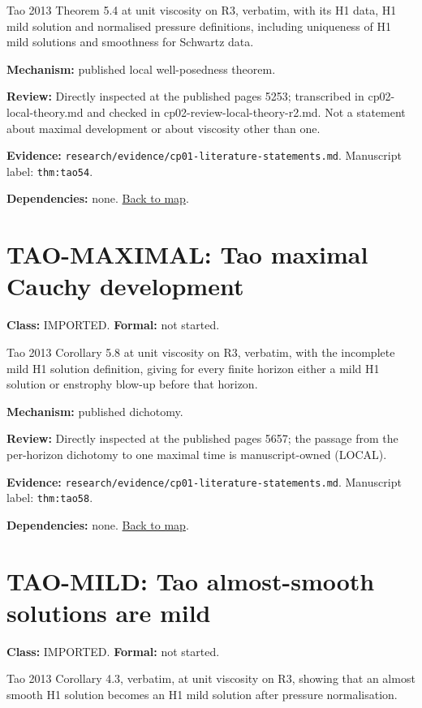 \documentclass[10pt]{article}
\begin{document}
Tao 2013 Theorem 5.4 at unit viscosity on R3, verbatim, with its H1 data, H1 mild solution and normalised pressure definitions, including uniqueness of H1 mild solutions and smoothness for Schwartz data.

\textbf{Mechanism:} published local well-posedness theorem.

\textbf{Review:} Directly inspected at the published pages 52\textendash{}\allowbreak{}53; transcribed in cp02-local-theory.md and checked in cp02-review-local-theory-r2.md. Not a statement about maximal development or about viscosity other than one.

\textbf{Evidence:} \texttt{research/evidence/cp01-literature-statements.md}. Manuscript label: \texttt{thm:tao54}.

\textbf{Dependencies:} none. \hyperref[map]{Back to map}.

\section*{TAO-MAXIMAL: Tao maximal Cauchy development}\label{node:TAO-MAXIMAL}
\textbf{Class:} IMPORTED. \textbf{Formal:} not started.

Tao 2013 Corollary 5.8 at unit viscosity on R3, verbatim, with the incomplete mild H1 solution definition, giving for every finite horizon either a mild H1 solution or enstrophy blow-up before that horizon.

\textbf{Mechanism:} published dichotomy.

\textbf{Review:} Directly inspected at the published pages 56\textendash{}\allowbreak{}57; the passage from the per-horizon dichotomy to one maximal time is manuscript-owned (LOCAL).

\textbf{Evidence:} \texttt{research/evidence/cp01-literature-statements.md}. Manuscript label: \texttt{thm:tao58}.

\textbf{Dependencies:} none. \hyperref[map]{Back to map}.

\section*{TAO-MILD: Tao almost-smooth solutions are mild}\label{node:TAO-MILD}
\textbf{Class:} IMPORTED. \textbf{Formal:} not started.

Tao 2013 Corollary 4.3, verbatim, at unit viscosity on R3, showing that an almost smooth H1 solution becomes an H1 mild solution after pressure normalisation.
\end{document}
